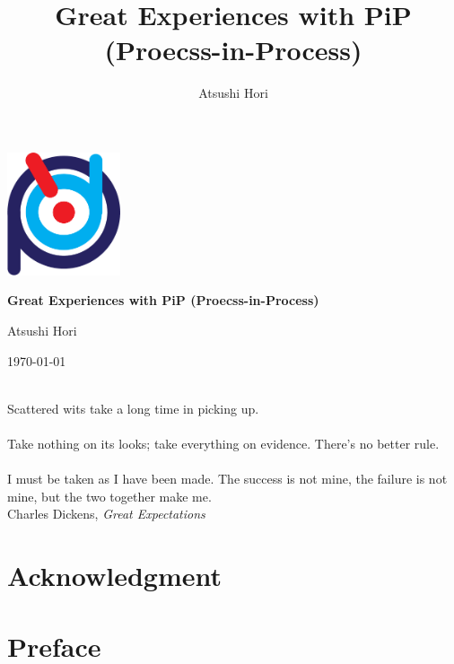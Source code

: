 \documentclass[a4paper,11pt,makeidx]{report} %
\title{Great Experiences with PiP (Proecss-in-Process)} %
\author{Atsushi Hori} %
\begin{document}
\begin{titlepage}
	\centering
	\includegraphics[width=0.25\textwidth]{Figs/PiP-logo.pdf}
        \par\vspace{3cm}
	{\huge\bfseries Great Experiences with PiP (Proecss-in-Process)\par}
	\vspace{9cm}
	{\Large Atsushi Hori\par}
	\vfill
	{\Large \today\par}
\end{titlepage}

\newpage%
{
  \noindent
  {
    \Large%
    \\
    Scattered wits take a long time in picking up.
    \\
    \\
    Take nothing on its looks; take everything on evidence. There’s no better rule.
    \\
    \\
    I must be taken as I have been made. The success is not
    mine, the failure is not mine, but the two together make me.
    \\
    }
  \flushright Charles Dickens, {\it Great Expectations}\\
}

\chapter*{Acknowledgment}


\chapter*{Preface}


\tableofcontents %
\listoffigures
\listoftables
\lstlistoflistings
\end{document}
